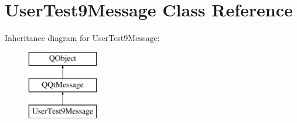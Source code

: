 \hypertarget{class_user_test9_message}{}\section{User\+Test9\+Message Class Reference}
\label{class_user_test9_message}
Inheritance diagram for User\+Test9\+Message\+:\begin{figure}[H]
\begin{center}
\leavevmode
\includegraphics[height=3.000000cm]{class_user_test9_message}
\end{center}
\end{figure}
